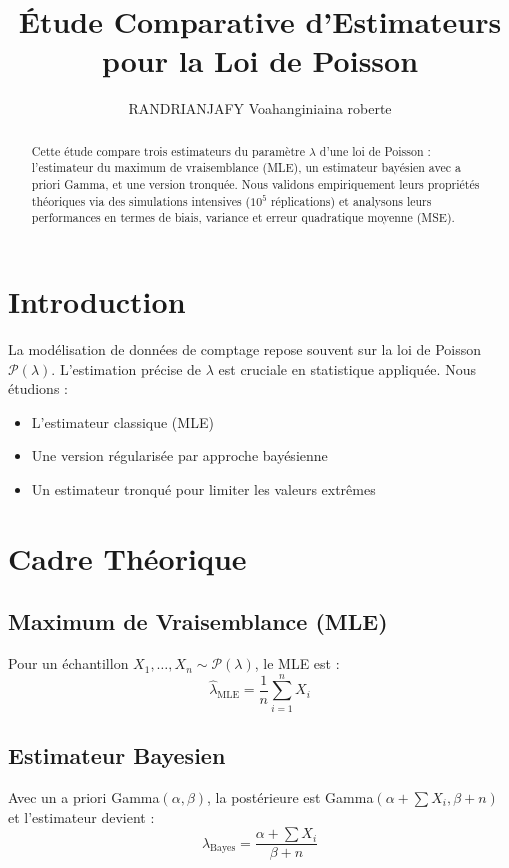 \documentclass[12pt]{article}
\title{Étude Comparative d'Estimateurs pour la Loi de Poisson}
\author{RANDRIANJAFY Voahanginiaina roberte}
\begin{document}
	
	\maketitle
	
	\begin{abstract}
		Cette étude compare trois estimateurs du paramètre $\lambda$ d'une loi de Poisson : l'estimateur du maximum de vraisemblance (MLE), un estimateur bayésien avec a priori Gamma, et une version tronquée. Nous validons empiriquement leurs propriétés théoriques via des simulations intensives ($10^5$ réplications) et analysons leurs performances en termes de biais, variance et erreur quadratique moyenne (MSE).
	\end{abstract}
	
	\section{Introduction}
	La modélisation de données de comptage repose souvent sur la loi de Poisson $\mathcal{P}(\lambda)$. L'estimation précise de $\lambda$ est cruciale en statistique appliquée. Nous étudions :
	
	\begin{itemize}
		\item L'estimateur classique (MLE)
		\item Une version régularisée par approche bayésienne
		\item Un estimateur tronqué pour limiter les valeurs extrêmes
	\end{itemize}
	
	\section{Cadre Théorique}
	\subsection{Maximum de Vraisemblance (MLE)}
	Pour un échantillon $X_1,\ldots,X_n \sim \mathcal{P}(\lambda)$, le MLE est :
	\[ \hat{\lambda}_{\text{MLE}} = \frac{1}{n}\sum_{i=1}^n X_i \]
	
	\subsection{Estimateur Bayesien}
	Avec un a priori Gamma$(\alpha,\beta)$, la postérieure est Gamma$(\alpha + \sum X_i, \beta + n)$ et l'estimateur devient :
	\[ \hat{\lambda}_{\text{Bayes}} = \frac{\alpha + \sum X_i}{\beta + n} \]
	
\end{document}
